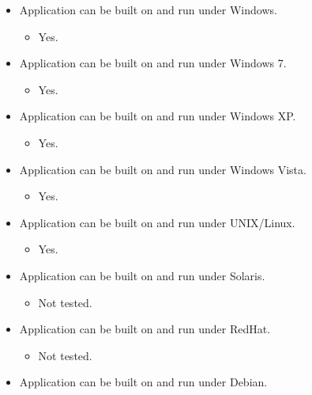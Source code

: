\begin{itemize}
\itemsep1pt\parskip0pt
\item
  Application can be built on and run under Windows.

  \begin{itemize}
  \itemsep1pt\parskip0pt
  \item
    Yes.
  \end{itemize}
\item
  Application can be built on and run under Windows 7.

  \begin{itemize}
  \itemsep1pt\parskip0pt
  \item
    Yes.
  \end{itemize}
\item
  Application can be built on and run under Windows XP.

  \begin{itemize}
  \itemsep1pt\parskip0pt
  \item
    Yes.
  \end{itemize}
\item
  Application can be built on and run under Windows Vista.

  \begin{itemize}
  \itemsep1pt\parskip0pt
  \item
    Yes.
  \end{itemize}
\item
  Application can be built on and run under UNIX/Linux.

  \begin{itemize}
  \itemsep1pt\parskip0pt
  \item
    Yes.
  \end{itemize}
\item
  Application can be built on and run under Solaris.

  \begin{itemize}
  \itemsep1pt\parskip0pt
  \item
    Not tested.
  \end{itemize}
\item
  Application can be built on and run under RedHat.

  \begin{itemize}
  \itemsep1pt\parskip0pt
  \item
    Not tested.
  \end{itemize}
\item
  Application can be built on and run under Debian.


\end{itemize}

